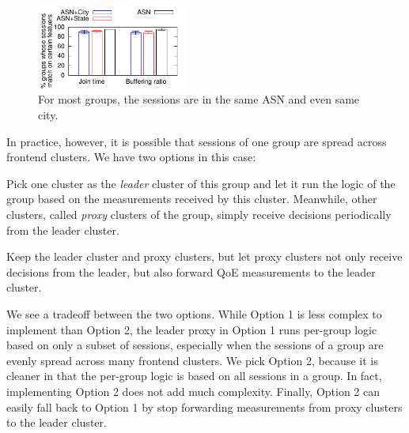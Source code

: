 \begin{figure}[t!]
\centering
\includegraphics[width=0.45\textwidth]{figures/pytheas-Eval-fraction-same-frontend.pdf}
\caption{For most groups, the sessions are in the same ASN and even same city.}
\label{fig:fraction-same-frontend}
\end{figure}

 In practice, however, it is possible that sessions of one group are spread across 
frontend clusters.
 We have two options in this case:
\begin{packedenumerate}
\item Pick one cluster as the {\em leader} cluster of this group and let it run the \mab logic of the group based on the measurements received by this cluster. Meanwhile, other clusters, called {\em proxy} clusters of the group, simply receive decisions periodically from the leader cluster.
\item Keep the leader cluster and proxy clusters, but let proxy clusters not only receive decisions from the leader, but also forward QoE measurements to the leader cluster.
\end{packedenumerate}
We see a tradeoff between the two options.
While Option 1 is less complex to implement than Option 2, the leader proxy in Option 1 runs per-group logic based on only a subset of sessions, especially when the sessions of a group are evenly spread across many frontend clusters.
We pick Option 2, because it is cleaner in that the per-group logic is based on all sessions in a group. In fact, implementing Option 2 does not add much complexity.
Finally, Option 2 can easily fall back to Option 1 by stop forwarding measurements from proxy clusters to the leader cluster.





